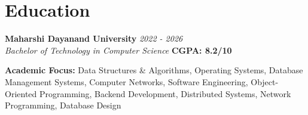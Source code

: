 \section{Education}

\noindent\textbf{Maharshi Dayanand University} \hfill \textit{2022 - 2026}\\
\textit{Bachelor of Technology in Computer Science} \hfill \textbf{CGPA: 8.2/10}
\begin{itemizecompact}
  \item \textbf{Academic Focus:} Data Structures \& Algorithms, Operating Systems, Database Management Systems, Computer Networks, Software Engineering, Object-Oriented Programming, Backend Development, Distributed Systems, Network Programming, Database Design
\end{itemizecompact}

